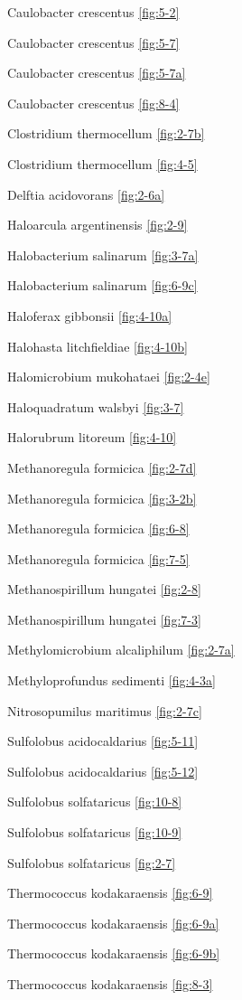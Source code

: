 \documentclass[]{tufte-book}
\begin{document}
Caulobacter crescentus \ref{fig:5-2}

Caulobacter crescentus \ref{fig:5-7}

Caulobacter crescentus \ref{fig:5-7a}

Caulobacter crescentus \ref{fig:8-4}

Clostridium thermocellum \ref{fig:2-7b}

Clostridium thermocellum \ref{fig:4-5}

Delftia acidovorans \ref{fig:2-6a}

Haloarcula argentinensis \ref{fig:2-9}

Halobacterium salinarum \ref{fig:3-7a}

Halobacterium salinarum \ref{fig:6-9c}

Haloferax gibbonsii \ref{fig:4-10a}

Halohasta litchfieldiae \ref{fig:4-10b}

Halomicrobium mukohataei \ref{fig:2-4e}

Haloquadratum walsbyi \ref{fig:3-7}

Halorubrum litoreum \ref{fig:4-10}

Methanoregula formicica \ref{fig:2-7d}

Methanoregula formicica \ref{fig:3-2b}

Methanoregula formicica \ref{fig:6-8}

Methanoregula formicica \ref{fig:7-5}

Methanospirillum hungatei \ref{fig:2-8}

Methanospirillum hungatei \ref{fig:7-3}

Methylomicrobium alcaliphilum \ref{fig:2-7a}

Methyloprofundus sedimenti \ref{fig:4-3a}

Nitrosopumilus maritimus \ref{fig:2-7c}

Sulfolobus acidocaldarius \ref{fig:5-11}

Sulfolobus acidocaldarius \ref{fig:5-12}

Sulfolobus solfataricus \ref{fig:10-8}

Sulfolobus solfataricus \ref{fig:10-9}

Sulfolobus solfataricus \ref{fig:2-7}

Thermococcus kodakaraensis \ref{fig:6-9}

Thermococcus kodakaraensis \ref{fig:6-9a}

Thermococcus kodakaraensis \ref{fig:6-9b}

Thermococcus kodakaraensis \ref{fig:8-3}
\end{document}
